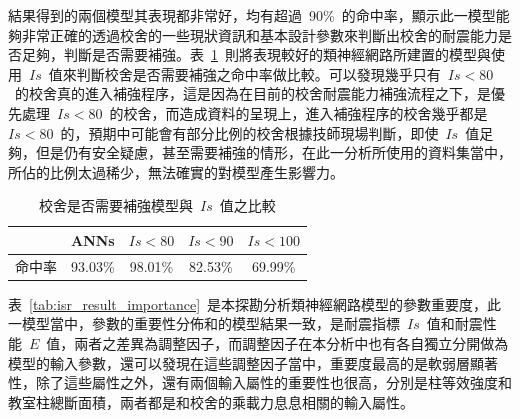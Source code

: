 結果得到的兩個模型其表現都非常好，均有超過~90\%~的命中率，顯示此一模型能夠非常正確的透過校舍的一些現狀資訊和基本設計參數來判斷出校舍的耐震能力是否足夠，判斷是否需要補強。表~\ref{tab:d_is_r_is_result}~則將表現較好的類神經網路所建置的模型與使用~$Is$~值來判斷校舍是否需要補強之命中率做比較。可以發現幾乎只有~$Is < 80$~的校舍真的進入補強程序，這是因為在目前的校舍耐震能力補強流程之下，是優先處理~$Is < 80$~的校舍，而造成資料的呈現上，進入補強程序的校舍幾乎都是~$Is < 80$~的，預期中可能會有部分比例的校舍根據技師現場判斷，即使~$Is$~值足夠，但是仍有安全疑慮，甚至需要補強的情形，在此一分析所使用的資料集當中，所佔的比例太過稀少，無法確實的對模型產生影響力。


{\renewcommand{\arraystretch}{1.5}
\begin{table}[hbtp]
  \begin{center}
    \caption{校舍是否需要補強模型與~$Is$~值之比較}
    \label{tab:d_is_r_is_result}
    \large
    \begin{tabular}{l c c c c}
      \hline
       & ANNs & $Is < 80$ & $Is < 90$ & $Is < 100$ \\
      \hline
     命中率 & 93.03\% & 98.01\% & 82.53\% & 69.99\% \\
      \hline
      \end{tabular}
  \end{center}
\end{table}
}

表~\ref{tab:isr_result_importance}~是本探勘分析類神經網路模型的參數重要度，此一模型當中，參數的重要性分佈和的模型結果一致，是耐震指標~$Is$~值和耐震性能~$E$~值，兩者之差異為調整因子，而調整因子在本分析中也有各自獨立分開做為模型的輸入參數，還可以發現在這些調整因子當中，重要度最高的是軟弱層顯著性，除了這些屬性之外，還有兩個輸入屬性的重要性也很高，分別是柱等效強度和教室柱總斷面積，兩者都是和校舍的乘載力息息相關的輸入屬性。


